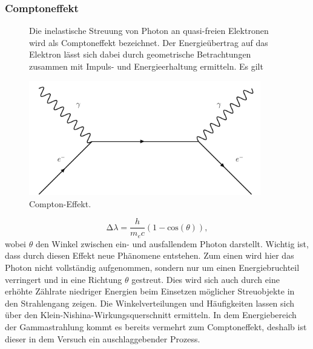 \subsubsection{Comptoneffekt}
\begin{figure}
\begin{minipage}{0.5\textwidth}
Die inelastische Streuung von Photon an quasi-freien Elektronen wird als Comptoneffekt bezeichnet. 
Der Energieübertrag auf das Elektron lässt sich dabei durch geometrische Betrachtungen zusammen mit Impuls- und Energieerhaltung ermitteln. Es gilt
\end{minipage}
\begin{minipage}{0.5\textwidth}
    \centering
    \includegraphics[width=0.9\textwidth]{bilder/compton.pdf}
    \caption{Compton-Effekt. \cite{feynman}}
\end{minipage}
\end{figure}


\begin{equation*}
    \increment \lambda = \frac{h}{m_e c} (1 - \text{cos}(\theta)),
\end{equation*}
wobei $\theta$ den Winkel zwischen ein- und ausfallendem Photon darstellt. 
Wichtig ist, dass durch diesen Effekt neue Phänomene entstehen. Zum einen wird hier das Photon nicht vollständig aufgenommen, sondern nur um einen Energiebruchteil verringert und in eine Richtung $\theta$ gestreut. 
Dies wird sich auch durch eine erhöhte Zählrate niedriger Energien beim Einsetzen möglicher Streuobjekte in den Strahlengang zeigen. Die Winkelverteilungen und Häufigkeiten lassen sich über den Klein-Nishina-Wirkungsquerschnitt ermitteln. 
In dem Energiebereich der Gammastrahlung kommt es bereits vermehrt zum Comptoneffekt, deshalb ist dieser in dem Versuch ein auschlaggebender Prozess.
